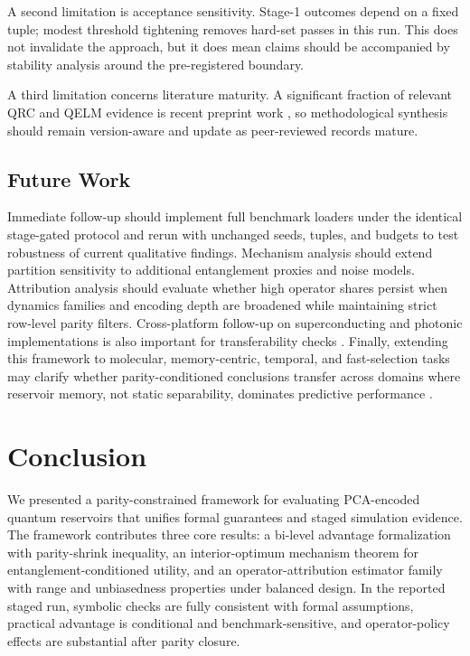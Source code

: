 \documentclass{article} %
\begin{document}
A second limitation is acceptance sensitivity. Stage-1 outcomes depend on a fixed tuple; modest threshold tightening removes hard-set passes in this run. This does not invalidate the approach, but it does mean claims should be accompanied by stability analysis around the pre-registered boundary.

A third limitation concerns literature maturity. A significant fraction of relevant QRC and QELM evidence is recent preprint work \citep{gross2026kernelop,gross2026paulitransfer,askari2025spin,karimi2025kerr}, so methodological synthesis should remain version-aware and update as peer-reviewed records mature.

\subsection{Future Work}
Immediate follow-up should implement full benchmark loaders under the identical stage-gated protocol and rerun with unchanged seeds, tuples, and budgets to test robustness of current qualitative findings. Mechanism analysis should extend partition sensitivity to additional entanglement proxies and noise models. Attribution analysis should evaluate whether high operator shares persist when dynamics families and encoding depth are broadened while maintaining strict row-level parity filters. Cross-platform follow-up on superconducting and photonic implementations is also important for transferability checks \citep{prieto2026superconducting,carles2025cqed,swierczewski2026optical}. Finally, extending this framework to molecular, memory-centric, temporal, and fast-selection tasks may clarify whether parity-conditioned conclusions transfer across domains where reservoir memory, not static separability, dominates predictive performance \citep{beaulieu2024robust,ahmed2025chaotic,kawanabe2026timedelayed,li2025chaoticmaps,assil2026memory,maier2025collider}.

\section{Conclusion}
We presented a parity-constrained framework for evaluating PCA-encoded quantum reservoirs that unifies formal guarantees and staged simulation evidence. The framework contributes three core results: a bi-level advantage formalization with parity-shrink inequality, an interior-optimum mechanism theorem for entanglement-conditioned utility, and an operator-attribution estimator family with range and unbiasedness properties under balanced design. In the reported staged run, symbolic checks are fully consistent with formal assumptions, practical advantage is conditional and benchmark-sensitive, and operator-policy effects are substantial after parity closure.
\end{document}
